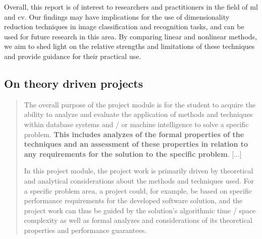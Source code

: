 Overall, this report is of interest to researchers and practitioners in the field of \gls{ml} and \gls{cv}. Our findings may have implications for the use of dimensionality reduction techniques in image classification and recognition tasks, and can be used for future research in this area. By comparing linear and nonlinear methods, we aim to shed light on the relative strengths and limitations of these techniques and provide guidance for their practical use.







\subsection*{On theory driven projects}
\blockcquote{Projectmodule}{The overall purpose of the project module is for the student to acquire the ability to analyze and evaluate the application of methods and techniques within database systems and / or machine intelligence to solve a specific problem. \textbf{This includes analyzes of the formal properties of the techniques and an assessment of these properties in relation to any requirements for the solution to the specific problem}. [...]

In this project module, the project work is primarily driven by theoretical and analytical considerations about the methods and techniques used. For a specific problem area, a project could, for example, be based on specific performance requirements for the developed software solution, and the project work can thus be guided by the solution's algorithmic time / space complexity as well as formal analyzes and considerations of its theoretical properties and performance guarantees.}




